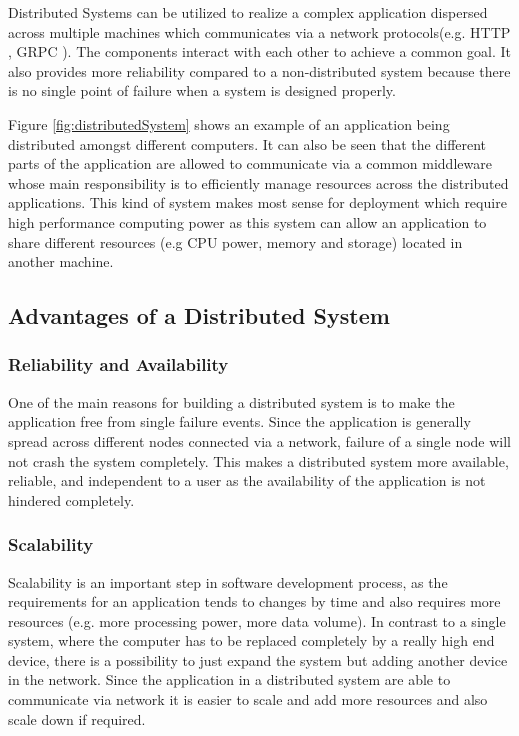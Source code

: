     \par
    Distributed Systems can be utilized to realize a complex application dispersed across
    multiple machines which communicates via a network protocols(e.g. HTTP \cite{HTTP}, 
    GRPC \cite{grpc}). The 
    components interact with each other to achieve a common goal. It also provides
    more reliability compared to a non-distributed system because there is no single point
    of failure when a system is designed properly. 

    \par
    Figure \ref{fig:distributedSystem} shows an example of an application being 
    distributed amongst different computers. It can also be seen that the different parts of the application are allowed
    to communicate via a common middleware whose main responsibility is to
    efficiently manage resources across the distributed applications. This kind of system
    makes most sense for deployment which require high performance computing power as this system can allow an application to share different
    resources (e.g CPU power, memory and storage) located in another machine.



    
        
    \subsection{Advantages of a Distributed System} 
        \subsubsection{Reliability and Availability}
        One of the main reasons for building a distributed system is to make the application free from single failure events.
        Since the application is generally spread across different nodes connected via a network, failure of a single node will not 
        crash the system completely. This makes a distributed system more available, reliable, and independent to a user as the availability
        of the application is not hindered completely.
        
        \subsubsection{Scalability}
        Scalability is an important step in software development process, as the requirements for an application tends to changes by time and also requires more resources
        (e.g. more processing power, more data volume). 
        In contrast to a single system, where the computer 
        has to be replaced completely by a really high end device, there is a possibility to just expand the system but adding another device in the network.
        Since the application in a distributed system are able to communicate via network it is easier to scale and add more resources and 
        also scale down if required. 
    
